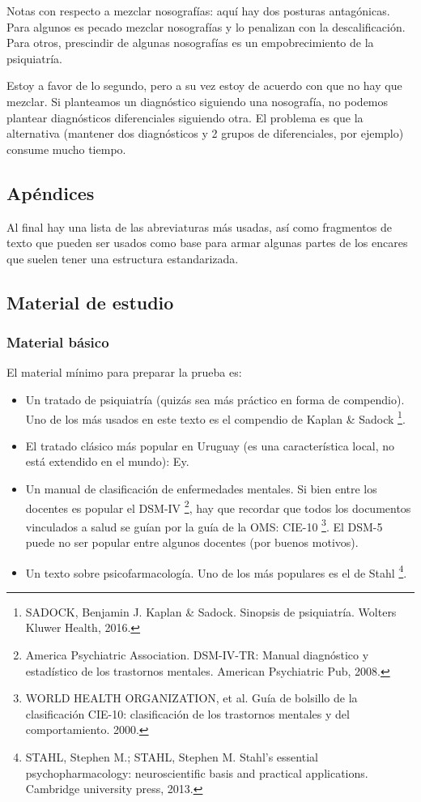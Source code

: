 \documentclass[encares.tex]{subfiles}
\begin{document}
Notas con respecto a mezclar nosografías: aquí hay dos posturas antagónicas. Para algunos es pecado mezclar nosografías y lo penalizan con la descalificación. Para otros, prescindir de algunas nosografías es un empobrecimiento de la psiquiatría.

Estoy a favor de lo segundo, pero a su vez estoy de acuerdo con que no hay que mezclar. Si planteamos un diagnóstico siguiendo una nosografía, no podemos plantear diagnósticos diferenciales siguiendo otra. El problema es que la alternativa (mantener dos diagnósticos y 2 grupos de diferenciales, por ejemplo) consume mucho tiempo.

\subsection*{Apéndices}

Al final hay una lista de las abreviaturas más usadas, así como fragmentos de texto que pueden ser usados como base para armar algunas partes de los encares que suelen tener una estructura estandarizada.

\subsection*{Material de estudio}
\subsubsection*{Material básico}

El material mínimo para preparar la prueba es:
\begin{itemize}
\item Un tratado de psiquiatría (quizás sea más práctico en forma de compendio). Uno de los más usados en este texto es el compendio de Kaplan \& Sadock \footnote{SADOCK, Benjamin J. Kaplan \& Sadock. Sinopsis de psiquiatría. Wolters Kluwer Health, 2016.}.
\item El tratado clásico más popular en Uruguay (es una característica local, no está extendido en el mundo): Ey\cite{ey1996}.
\item Un manual de clasificación de enfermedades mentales. Si bien entre los docentes es popular el DSM-IV \footnote{America Psychiatric Association. DSM-IV-TR: Manual diagnóstico y estadístico de los trastornos mentales. American Psychiatric Pub, 2008.}, hay que recordar que todos los documentos vinculados a salud se guían por la guía de la OMS: CIE-10 \footnote{WORLD HEALTH ORGANIZATION, et al. Guía de bolsillo de la clasificación CIE-10: clasificación de los trastornos mentales y del comportamiento. 2000.}. El DSM-5 puede no ser popular entre algunos docentes (por buenos motivos).
\item Un texto sobre psicofarmacología. Uno de los más populares es el de Stahl \footnote{STAHL, Stephen M.; STAHL, Stephen M. Stahl's essential psychopharmacology: neuroscientific basis and practical applications. Cambridge university press, 2013.}.
\end{itemize}
\end{document}
